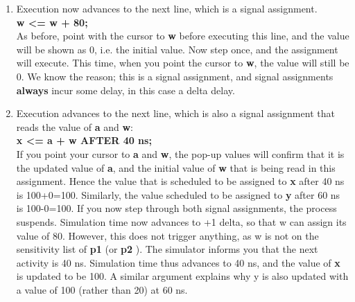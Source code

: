 \documentclass[a4paper,12pt]{article}
\newcommand\tab[1][1cm]{\hspace*{#1}}
\begin{document}
\begin{enumerate}
\item %
Execution now advances to the next line, which is a signal assignment.
\\
\tab \textbf{w \textless= w + 80;}
\\
As before, point with the cursor to \textbf{w} before executing this line, and the value will be shown as 0, i.e. the initial value. Now step once, and the assignment will execute. This time, when you point the cursor to \textbf{w}, the value will still be 0. We know the reason; this is a signal assignment, and signal assignments \textbf{always} incur some delay, in this case a delta delay.

\item %
Execution advances to the next line, which is also a signal assignment that reads the value of \textbf{a} and \textbf{w}:
\\
\tab \textbf{x <= a + w AFTER 40 ns;}
\\
If you point your cursor to \textbf{a} and \textbf{w}, the pop-up values will confirm that it is the updated value of \textbf{a}, and the initial value of \textbf{w} that is being read in this assignment. Hence the value that is scheduled to be assigned to \textbf{x} after 40 ns is 100+0=100. Similarly, the value scheduled to be assigned to \textbf{y} after 60 ns is 100-0=100. If you now step through both signal assignments, the process suspends. Simulation time now advances to +1 delta, so that w can assign its value of 80. However, this does not trigger anything, as w is not on the sensitivity list of \textbf{p1} (or \textbf{p2} ). The simulator informs you that the next activity is 40 ns. Simulation time thus advances to 40 ns, and the value of \textbf{x} is updated to be 100. A similar argument explains why y is also updated with a value of 100 (rather than 20) at 60 ns.
\\
\\

\clearpage


\end{enumerate}
\end{document}
